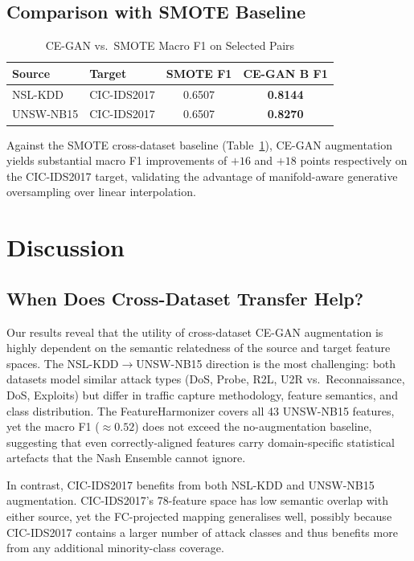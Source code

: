 \documentclass[conference]{IEEEtran}
\begin{document}
\subsection{Comparison with SMOTE Baseline}

\begin{table}[htbp]
\caption{CE-GAN vs.\ SMOTE Macro F1 on Selected Pairs}
\label{tab:smote}
\centering
\begin{tabular}{llcc}
\toprule
Source & Target & SMOTE F1 & CE-GAN B F1 \\
\midrule
NSL-KDD   & CIC-IDS2017 & 0.6507 & \textbf{0.8144} \\
UNSW-NB15 & CIC-IDS2017 & 0.6507 & \textbf{0.8270} \\
\bottomrule
\end{tabular}
\end{table}

Against the SMOTE cross-dataset baseline (Table~\ref{tab:smote}),
CE-GAN augmentation yields substantial macro F1 improvements of
$+16$ and $+18$ points respectively on the CIC-IDS2017 target,
validating the advantage of manifold-aware generative oversampling
over linear interpolation.

\section{Discussion}

\subsection{When Does Cross-Dataset Transfer Help?}

Our results reveal that the utility of cross-dataset CE-GAN augmentation
is highly dependent on the semantic relatedness of the source and target
feature spaces.
The NSL-KDD$\to$UNSW-NB15 direction is the most challenging: both
datasets model similar attack types (DoS, Probe, R2L, U2R vs.\
Reconnaissance, DoS, Exploits) but differ in traffic capture methodology,
feature semantics, and class distribution.
The FeatureHarmonizer covers all 43 UNSW-NB15 features, yet the macro F1
($\approx 0.52$) does not exceed the no-augmentation baseline,
suggesting that even correctly-aligned features carry domain-specific
statistical artefacts that the Nash Ensemble cannot ignore.

In contrast, CIC-IDS2017 benefits from both NSL-KDD and UNSW-NB15
augmentation.
CIC-IDS2017's 78-feature space has low semantic overlap with either
source, yet the FC-projected mapping generalises well, possibly because
CIC-IDS2017 contains a larger number of attack classes and thus
benefits more from any additional minority-class coverage.
\end{document}
